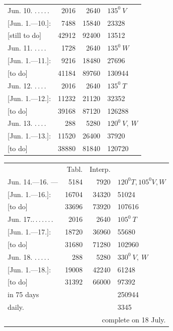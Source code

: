 \begin{center}
\begin{tabular}{@{}p{.36\linewidth}rrl@{}}
Jun. 10. \BJournalDay{☿}\nobreak\hspace{.2em}\mbox{.\,.\,.\,.\,.}\hfill&2016&2640&\(\mathit{135}^0\ V\)\\
\hfill [Jun. 1.—10.]:&7488&15840&23328\\
\hfill [still to do]&42912&92400&13512\\
Jun. 11. \BJournalDay{♃}\nobreak\hspace{.2em}\mbox{.\,.\,.\,.}\hfill&1728&2640&\(\mathit{135}^0\ W\)\\
\hfill [Jun. 1.—11.]:&9216&18480&27696\\
\hfill [to do]&41184&89760&130944\\
Jun. 12. \BJournalDay{♀}\nobreak\hspace{.2em}\mbox{.\,.\,.\,.}\hfill&2016&2640&\(\mathit{135}^0\ T\)\\
\hfill [Jun. 1.—12.]:&11232&21120&32352\\
\hfill [to do]&39168&87120&126288\\
Jun. 13. \BJournalDay{♄}\nobreak\hspace{.2em}\mbox{.\,.\,.\,.}\hfill&288&5280&\(\mathit{120}^0\ V,\ W\)\\
\hfill [Jun. 1.—13.]:&11520&26400&37920\\
\hfill [to do]&38880&81840&120720
\end{tabular}
\end{center}
\begin{center}
\begin{tabular}{@{}p{.36\linewidth}rrl@{}}
&Tabl.&Interp.&\\
Jun. 14.—16. \BJournalDay{☉}—\BJournalDay{♂}&5184&7920&\(\mathit{120}^0 T,\mathit{105}^0 V,W\)\\
\hfill [Jun. 1.—16.]:&16704&34320&51024\\
\hfill [to do]&33696&73920&107616\\
Jun. 17.\nobreak\hspace{.2em}\mbox{.\,.\,.\,.\,.\,.\,.}\hfill&2016&2640&\(\mathit{105}^0\ T\)\\
\hfill [Jun. 1.—17.]:&18720&36960&55680\\
\hfill [to do]&31680&71280&102960\\
Jun. 18. \BJournalDay{♃}\nobreak\hspace{.2em}\mbox{.\,.\,.\,.\,.}\hfill&288&5280&\(\mathit{330}^0\ V,\ W\)\\
\hfill [Jun. 1.—18.]:&19008&42240&61248\\
\hfill [to do]&31392&66000&97392\\
\hfill in 75 days&&&250944\\
\hfill daily.&&&3345\\
\multicolumn{4}{r}{complete on 18 July.}\\
\hline
\end{tabular}
\end{center}
